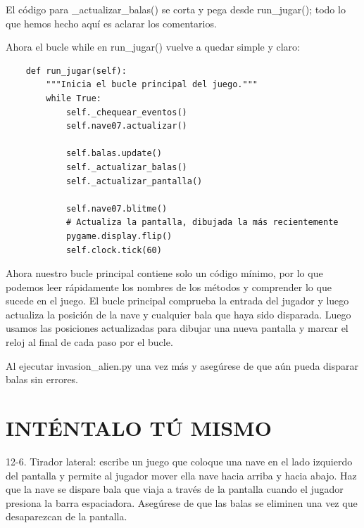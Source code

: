 El código para {\ttfamily \_actualizar\_balas()} se corta y pega desde {\ttfamily run\_jugar()}; todo lo que hemos hecho aquí 
es aclarar los comentarios. 

Ahora el bucle while en {\ttfamily run\_jugar()} vuelve a quedar  simple y claro:


\hspace{-2.4cm}{\ttfamily \scriptsize invasión}

\vspace{-0.2cm}
\hspace{-2.1cm}{\ttfamily \scriptsize \_alien.py}\vspace{-0.84cm}
\begin{lstlisting}
    def run_jugar(self):
        """Inicia el bucle principal del juego."""
        while True:
            self._chequear_eventos()            
            self.nave07.actualizar()            

            self.balas.update()           
            self._actualizar_balas()
            self._actualizar_pantalla()            

            self.nave07.blitme()
            # Actualiza la pantalla, dibujada la más recientemente
            pygame.display.flip()
            self.clock.tick(60)
\end{lstlisting}


Ahora nuestro bucle principal contiene solo un código mínimo, por lo que podemos leer rápidamente los nombres de los métodos
y comprender lo que sucede en el juego. El bucle principal comprueba la entrada del jugador y luego actualiza la posición de la nave y cualquier bala que haya sido disparada. Luego usamos las posiciones actualizadas para dibujar una nueva pantalla y marcar el reloj al final de cada paso por el bucle.


Al ejecutar {\ttfamily invasion\_alien.py} una vez más y asegúrese de que aún pueda disparar balas sin errores.




\section{INTÉNTALO TÚ MISMO}

12-6. Tirador lateral: escribe un juego que coloque una nave en el lado izquierdo del
pantalla y permite al jugador mover ella nave hacia arriba y hacia abajo. 
Haz que  la nave se dispare  bala que viaja a través de la pantalla cuando el jugador presiona la barra espaciadora.
Asegúrese de que las balas se eliminen una vez que desaparezcan de la pantalla.

